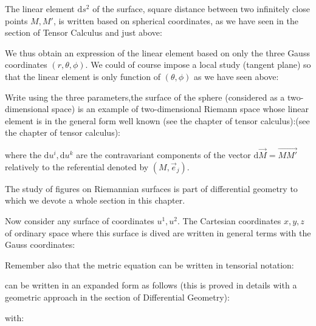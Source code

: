 	The linear element $\mathrm{d}s^2$ of the surface, square distance between two infinitely close points $M, M '$, is written based on spherical coordinates, as we have seen in the section of Tensor Calculus and just above:
	
	We thus obtain an expression of the linear element based on only the three Gauss  coordinates $(r,\theta,\phi)$. We could of course impose a local study (tangent plane) so that the linear element is only function of $(\theta,\phi)$ as we have seen above:
	
	Write using the three parameters,the surface of the sphere (considered as a two-dimensional space) is an example of two-dimensional Riemann space whose linear element is in the general form well known (see the chapter of tensor calculus):(see the chapter of tensor calculus):
	
	where the $\mathrm{d}u^i,\mathrm{d}u^k$ are the contravariant components of the vector $\mathrm{d}\vec{M}=\overrightarrow{MM'}$ relatively to the referential denoted by $(M,\vec{e}_j)$.
	\begin{tcolorbox}[title=Remark,colframe=black,arc=10pt]
	The study of figures on Riemannian surfaces is part of differential geometry to which we devote a whole section in this chapter.
	\end{tcolorbox}
	Now consider any surface of coordinates $u^1,u^2$. The Cartesian coordinates $x, y, z$ of ordinary space where this surface is dived are written in general terms with the Gauss coordinates:
	
	Remember also that the metric equation can be written in tensorial notation:
	
	can be written in an expanded form as follows (this is proved in details with a geometric approach in the section of Differential Geometry):
	
	with:
	
